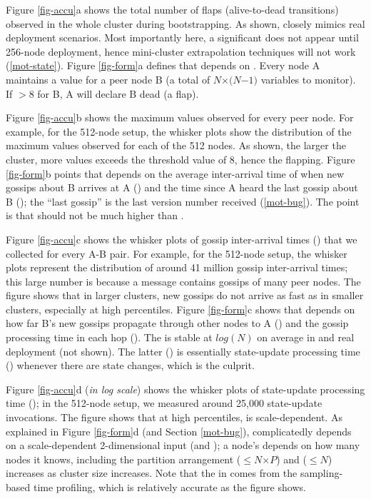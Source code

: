 Figure \ref{fig-accu}a shows the total number of flaps (alive-to-dead
transitions) observed in the whole cluster during bootstrapping.  
As shown, \sck closely mimics
real deployment scenarios.  Most importantly here, a significant \flaps
does not appear until 256-node deployment, 
hence mini-cluster extrapolation techniques will not work (\sec\ref{mot-state}).
%
Figure \ref{fig-form}a defines that \flaps depends on 
\phi \cite{Hayashibara+04-PhiFailureDetector}. Every node A
maintains a \phi value for a peer node B (a total of $N$$\times$$(N$$-$$1)$
variables to monitor).  If \phi$>$8 for B, A will declare B dead (a flap).

Figure \ref{fig-accu}b shows the maximum \phi values observed for every
peer node.  For example, for the 512-node setup, the whisker plots show the
distribution of the maximum \phi values observed for each of the 512
nodes.  As shown, the larger the cluster, more \phi values exceeds the
threshold value of 8, hence the flapping.
%
Figure \ref{fig-form}b points that \phi depends on the average
inter-arrival time of when new gossips about B arrives at A (\gosAvg) and the
time since A heard the last gossip about B (\gosLast); the ``last gossip''
is the last version number received (\sec\ref{mot-bug}).  The point is that
\gosLast should not be much higher than \gosAvg.






Figure \ref{fig-accu}c shows the whisker plots of gossip inter-arrival
times (\gosLast) that we collected for every A-B pair.  For example, for the
512-node setup, the whisker plots represent the distribution of 
around 41 million 
gossip inter-arrival times; this large number is because a message
contains gossips of many peer nodes.  The figure shows that in larger
clusters, new gossips do not arrive as fast as in smaller clusters,
especially at high percentiles.
%
Figure \ref{fig-form}c shows that \gosLast depends on how far B's new
gossips propagate through other nodes to A (\hops) and the gossip
processing time in each hop (\gosProc).  The \hops is stable
at $log(N)$ on average in \sck and real deployment (not shown).  The
latter (\gosProc) is essentially state-update processing time (\supProc)
whenever there are state changes, which is the culprit.

Figure \ref{fig-accu}d ({\em in log scale}) shows the whisker plots of
state-update processing time (\supProc); in the 512-node setup, we
measured around 25,000 state-update invocations.  The figure shows that at high
percentiles, \supProc is scale-dependent.  As explained in 
Figure \ref{fig-form}d (and Section \ref{mot-bug}), \supProc complicatedly
depends on a scale-dependent 2-dimensional input (\ringTable and
\newStates); a node's \ringTable depends on how many nodes it knows,
including the partition arrangement ($\leq$$N$$\times$$P$) and \newStates
($\leq$$N$) increases as cluster size increases.
%
%
Note that the \supProc in \sck comes from the sampling-based time
profiling, which is relatively accurate as the figure
shows.

